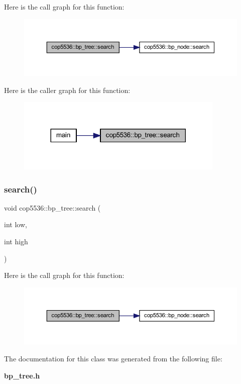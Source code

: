 Here is the call graph for this function\+:
\nopagebreak
\begin{figure}[H]
\begin{center}
\leavevmode
\includegraphics[width=350pt]{classcop5536_1_1bp__tree_ab19cba7e122848174579357585b43cb4_cgraph}
\end{center}
\end{figure}
Here is the caller graph for this function\+:
\nopagebreak
\begin{figure}[H]
\begin{center}
\leavevmode
\includegraphics[width=281pt]{classcop5536_1_1bp__tree_ab19cba7e122848174579357585b43cb4_icgraph}
\end{center}
\end{figure}
\mbox{\label{classcop5536_1_1bp__tree_afdd6e5e9febb1a2e60d993efb8aed048}} 
\subsubsection{search()\hspace{0.1cm}{\footnotesize\ttfamily [2/2]}}
{\footnotesize\ttfamily void cop5536\+::bp\+\_\+tree\+::search (\begin{DoxyParamCaption}\item[{int}]{low,  }\item[{int}]{high }\end{DoxyParamCaption})}

Here is the call graph for this function\+:
\nopagebreak
\begin{figure}[H]
\begin{center}
\leavevmode
\includegraphics[width=350pt]{classcop5536_1_1bp__tree_afdd6e5e9febb1a2e60d993efb8aed048_cgraph}
\end{center}
\end{figure}


The documentation for this class was generated from the following file\+:\begin{DoxyCompactItemize}
\item 
\textbf{ bp\+\_\+tree.\+h}\end{DoxyCompactItemize}
